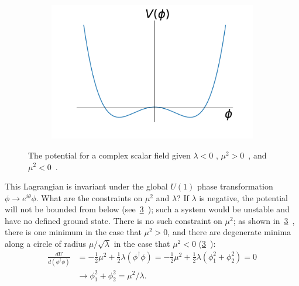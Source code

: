 \begin{figure}[tb]
\begin{subfigure}{0.33\textwidth}
    \caption{}
    \label{sfig:pos_mass}
  \end{subfigure}%
  \begin{subfigure}{0.33\textwidth}
    \centering
    \includegraphics[width=\textwidth]{figures/complex_scalar_neg_mass}
    \caption{}
    \label{sfig:neg_mass}
  \end{subfigure}
  \caption[Potential of a complex scalar field]{
    The potential for a complex scalar field given $\lambda < 0$ ,
     $\mu^2 > 0$~, and $\mu^2 < 0$~.
  }
  \label{fig:complex_potential}
\end{figure}
This Lagrangian is invariant under the global $U(1)$ phase transformation $\phi
\rightarrow e^{i\theta}\phi$. What are the constraints on $\mu^2$ and $\lambda$?
If $\lambda$ is negative, the potential will not be bounded from below
(see~\cref{fig:complex_potential}~); such a system would
be unstable and have no defined ground state. There is no such constraint on
$\mu^2$; as shown in~\cref{fig:complex_potential}~, there
is one minimum in the case that $\mu^2>0$, and there are degenerate minima along
a circle of radius $\mu/\sqrt{\lambda}$ in the case that $\mu^2 < 0$
(\cref{fig:complex_potential}~):
\begin{align}
  \frac{dU}{d(\phi^\dagger\phi)} &=
  - \frac{1}{2}\mu^2
  + \frac{1}{2}\lambda(\phi^\dagger\phi) =
  - \frac{1}{2}\mu^2
  + \frac{1}{2}\lambda(\phi_1^2 + \phi_2^2) = 0 \\
  &\rightarrow \phi_1^2 + \phi_2^2 = \mu^2 / \lambda.
\end{align}

